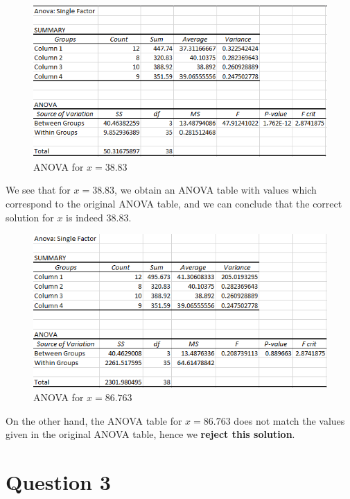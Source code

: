 \documentclass[12pt]{article}
\begin{document}
\begin{figure}[H]
    \centering
    \includegraphics[width=\textwidth]{Images/Q2firstx.png}
    \caption{ANOVA for $x = 38.83$}
    \label{fig:2-firstx}
\end{figure} 

\noindent We see that for $x = 38.83$, we obtain an ANOVA table with values which correspond to the original ANOVA table, and we can conclude that the correct solution for $x$ is indeed 38.83.

\begin{figure}[H]
    \centering
    \includegraphics[width=\textwidth]{Images/Q2secondx.png}
    \caption{ANOVA for $x = 86.763$}
    \label{fig:2-secondx}
\end{figure} 

\noindent On the other hand, the ANOVA table for $x = 86.763$ does not match the values given in the original ANOVA table, hence we \textbf{reject this solution}. 

\newpage

\section*{Question 3}
\end{document}
